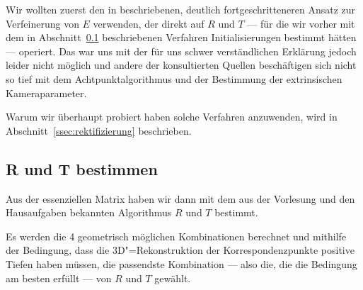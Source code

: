 Wir wollten zuerst den in \cite[S. 167]{Ma} beschriebenen, deutlich fortgeschritteneren Ansatz zur Verfeinerung von $E$ verwenden, der direkt auf $R$ und $T$ --- für die wir vorher mit dem in Abschnitt~\ref{ssec:r_und_t} beschriebenen Verfahren Initialisierungen bestimmt hätten --- operiert. Das war uns mit der für uns schwer verständlichen Erklärung jedoch leider nicht möglich und andere der konsultierten Quellen beschäftigen sich nicht so tief mit dem Achtpunktalgorithmus und der Bestimmung der extrinsischen Kameraparameter.

Warum wir überhaupt probiert haben solche Verfahren anzuwenden, wird in Abschnitt~\ref{ssec:rektifizierung} beschrieben.

\subsection{R und T bestimmen}
\label{ssec:r_und_t}
Aus der essenziellen Matrix haben wir dann mit dem aus der Vorlesung und den Hausaufgaben bekannten Algorithmus $R$ und $T$ bestimmt.

Es werden die 4 geometrisch möglichen Kombinationen berechnet und mithilfe der Bedingung, dass die 3D"=Rekonstruktion der Korrespondenzpunkte positive Tiefen haben müssen, die passendste Kombination --- also die, die die Bedingung am besten erfüllt --- von $R$ und $T$ gewählt.